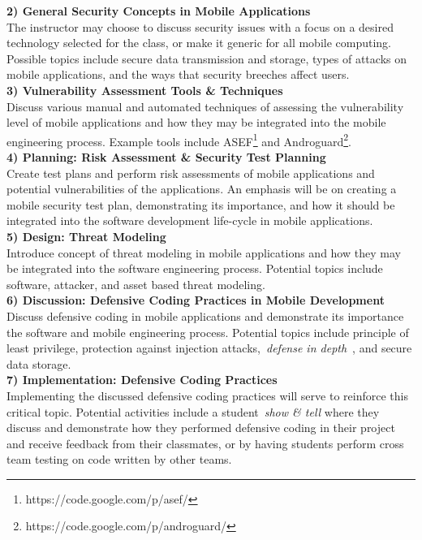 \documentclass[conference]{IEEEtran}
\begin{document}
\textbf{2) General Security Concepts in Mobile Applications}\\
The instructor may choose to discuss security issues with a focus on a desired technology selected for the class, or make it generic for all mobile computing. Possible topics include secure data transmission and storage, types of attacks on mobile applications, and the ways that security breeches affect users.\\

\textbf{3) Vulnerability Assessment Tools \& Techniques }\\
Discuss various manual and automated techniques of assessing the vulnerability level of mobile applications and how they may be integrated into the mobile engineering process. Example tools include ASEF\footnote{https://code.google.com/p/asef/} and Androguard\footnote{https://code.google.com/p/androguard/}.\\

\textbf{4) Planning: Risk Assessment \& Security Test Planning}\\
Create test plans and perform risk assessments of mobile applications and potential vulnerabilities of the applications. An emphasis will be on creating a mobile security test plan, demonstrating its importance, and how it should be integrated into the software development life-cycle in mobile applications. \\

\textbf{5) Design: Threat Modeling}\\
Introduce concept of threat modeling in mobile applications and how they may be integrated into the software engineering process. Potential topics include software, attacker, and asset based threat modeling.\\

\textbf{6) Discussion: Defensive Coding Practices in Mobile Development}\\
Discuss defensive coding in mobile applications and demonstrate its importance the software and mobile engineering process. Potential topics include principle of least privilege, protection against injection attacks,~\emph{defense in depth}~\cite{defenseindepth_url}, and secure data storage. \\

\textbf{7) Implementation: Defensive Coding Practices}\\
Implementing the discussed defensive coding practices will serve to reinforce this critical topic. Potential activities include a student~\emph{show \& tell} where they discuss and demonstrate how they performed defensive coding in their project and receive feedback from their classmates, or by having students perform cross team testing on code written by other teams.
\end{document}

